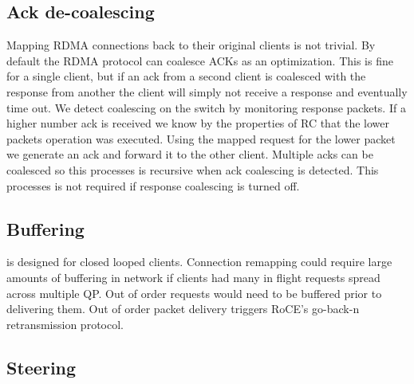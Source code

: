 \subsection{Ack de-coalescing}

Mapping RDMA connections back to their original clients is
not trivial. By default the RDMA protocol can coalesce ACKs
as an optimization. This is fine for a single client, but if
an ack from a second client is coalesced with the response
from another the client will simply not receive a response
and eventually time out. We detect coalescing on the switch
by monitoring response packets. If a higher number ack is
received we know by the properties of RC that the lower
packets operation was executed. Using the mapped request for
the lower packet we generate an ack and forward it to the
other client. Multiple acks can be coalesced so this
processes is recursive when ack coalescing is detected. This
processes is not required if response coalescing is turned
off.

\subsection{Buffering}

\sword is designed for closed looped clients. Connection
remapping could require large amounts of buffering in
network if clients had many in flight requests spread across
multiple QP. Out of order requests would need to be buffered
prior to delivering them. Out of order packet delivery
triggers RoCE's go-back-n retransmission protocol.

\subsection{Steering}

